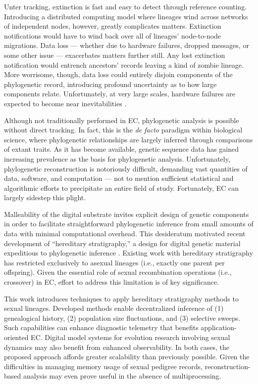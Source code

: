 Unter tracking, extinction is fast and easy to detect through reference counting.
Introducing a distributed computing model where lineages wind across networks of independent nodes, however, greatly complicates matters.
Extinction notifications would have to wind back over all of lineages' node-to-node migrations.
Data loss --- whether due to hardware failures, dropped messages, or some other issue --- exacerbates matters further still.
Any lost extinction notification would entrench ancestors' records leaving a kind of zombie lineage.
More worrisome, though, data loss could entirely disjoin components of the phylogenetic record, introducing profound uncertainty as to how large components relate.
Unfortunately, at very large scales, hardware failures are expected to become near inevitabilities \citep{gropp2013programming}.

Although not traditionally performed in EC, phylogenetic analysis is possible without direct tracking.
In fact, this is the \textit{de facto} paradigm within biological science, where phylogenetic relationships are largely inferred through comparisons of extant traits.
As it has become available, genetic sequence data has gained increasing prevalence as the basis for phylogenetic analysis.
Unfortunately, phylogenetic reconstruction is notoriously difficult, demanding vast quantities of data, software, and computation --- not to mention sufficient statistical and algorithmic efforts to precipitate an entire field of study.
Fortunately, EC can largely sidestep this plight.

Malleability of the digital substrate invites explicit design of genetic components in order to facilitate straightforward phylogenetic inference from small amounts of data with minimal computational overhead.
This desideratum motivated recent development of ``hereditary stratigraphy,'' a design for digital genetic material expeditious to phylogenetic inference \citep{moreno2022hereditary}.
Existing work with hereditary stratigraphy has restricted exclusively to asexual lineages (i.e., exactly one parent per offspring).
Given the essential role of sexual recombination operations (i.e., crossover) in EC, effort to address this limitation is of key significance.

This work introduces techniques to apply hereditary stratigraphy methods to sexual lineages.
Developed methods enable decentralized inference of (1) genealogical history, (2) population size fluctuations, and (3) selective sweeps.
Such capabilities can enhance diagnostic telemetry that benefits application-oriented EC.
Digital model systems for evolution research involving sexual dynamics may also benefit from enhanced observability.
In both cases, the proposed approach affords greater scalability than previously possible.
Given the difficulties in managing memory usage of sexual pedigree records, reconstruction-based analysis may even prove useful in the absence of multiprocessing.
